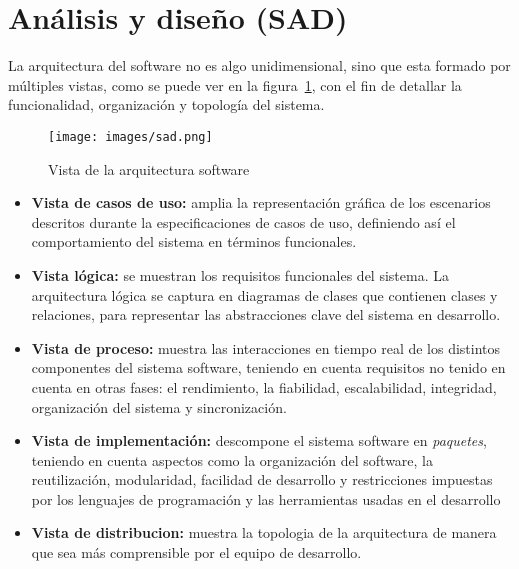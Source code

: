 
\section{Análisis y diseño (SAD)}

La arquitectura del software no es algo unidimensional, sino que esta formado 
por múltiples vistas, como se puede ver en la figura~\ref{fig:sad}, con el 
fin de detallar la funcionalidad, organización y topología del sistema.

\begin{figure}[hp]
	\centering
	\texttt{[image: images/sad.png]}
	\caption{Vista de la arquitectura software}
	\label{fig:sad}
\end{figure}

\begin{itemize}
  \item \textbf{Vista de casos de uso:} amplia la representación gráfica 
	de los escenarios descritos durante la especificaciones de casos 
	de uso, definiendo así el comportamiento del sistema en términos 
	funcionales.
  \item \textbf{Vista lógica:} se muestran los requisitos funcionales 
	del sistema. La arquitectura lógica se captura en diagramas de clases 
	que contienen clases y relaciones, para representar las abstracciones 
	clave del sistema en desarrollo.
  \item \textbf{Vista de proceso:} muestra las interacciones en tiempo real de
	los distintos componentes del sistema software, teniendo en cuenta
	requisitos no tenido en cuenta en otras fases: el rendimiento, la 
	fiabilidad, escalabilidad, integridad, organización del sistema y 
	sincronización. 
  \item \textbf{Vista de implementación:} descompone el sistema software en
	\emph{paquetes}, teniendo en cuenta aspectos como la organización del 
	software, la reutilización, modularidad, facilidad de desarrollo y 
	restricciones impuestas por los lenguajes de programación y las 
	herramientas usadas en el desarrollo
  \item \textbf{Vista de distribucion:} muestra la topologia de la arquitectura
	de manera que sea más comprensible por el equipo de desarrollo.
\end{itemize}

\newpage



\newpage



\newpage



\newpage



\newpage




